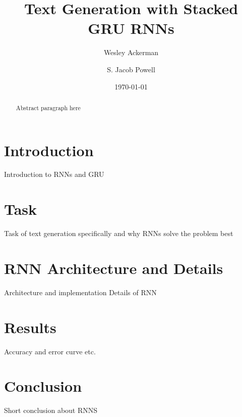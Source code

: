 \documentclass[12pt]{article}
\title{Text Generation with Stacked GRU RNNs}
\author{Wesley Ackerman \and S. Jacob Powell}
\date{\today}
\begin{document}
\maketitle

\begin{abstract}
    Abstract paragraph here
\end{abstract}

\section{Introduction}
Introduction to RNNs and GRU

\section{Task}
Task of text generation specifically and why RNNs solve the problem best

\section{RNN Architecture and Details}
Architecture and implementation Details of RNN

\section{Results}
Accuracy and error curve etc.

\section{Conclusion}
Short conclusion about RNNS
\end{document}
